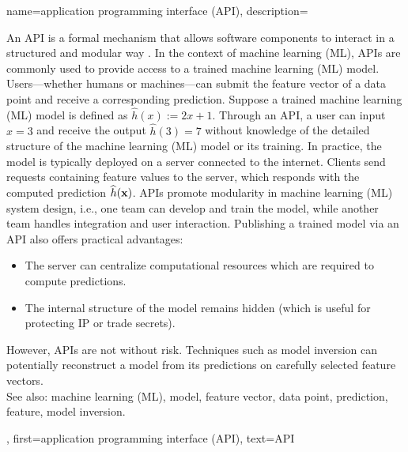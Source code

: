 {name={application programming interface (API)},
		description={			
			An  API is a formal mechanism that 
			allows software components to interact in a structured and modular way \cite{RestfulBook2013}.
			In the context of machine learning (ML), APIs are commonly used to provide access to a trained machine learning (ML) model. 
			Users—whether humans or machines—can submit the feature vector of a data point and receive 
			a corresponding prediction. Suppose a trained machine learning (ML) model is defined 
			as $\widehat{h}(x) := 2 x + 1$. Through an API, a user 
			can input $x = 3$ and receive the output $\widehat{h}(3) = 7$ 
			without knowledge of the detailed structure of the machine learning (ML) model or its training. 
			In practice, the model is typically deployed on a server connected to the internet. 
			Clients send requests containing feature values to the server, which responds with 
			the computed prediction $\widehat{h}({\bf x})$. APIs promote modularity 
			in machine learning (ML) system design, i.e., one team can develop and train the model, while another team
			handles integration and user interaction. Publishing a trained model via an API also 
			offers practical advantages: 
			\begin{itemize} 
				\item The server can centralize computational resources which are required to compute predictions. 
		        \item The internal structure of the model remains hidden (which is useful for protecting IP or trade secrets). 
		    \end{itemize} 
			However, APIs are not without risk. Techniques such as model inversion can potentially reconstruct a 
			model from its predictions on carefully selected feature vectors.
					\\
		See also: machine learning (ML), model, feature vector, data point, prediction, feature, model inversion.
			},
		first={application programming interface (API)},
		text={API}
}






